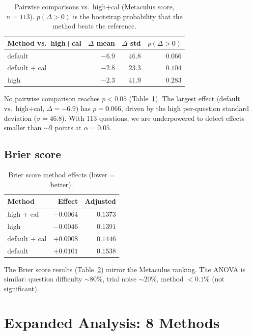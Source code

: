 \documentclass[11pt]{article}
\begin{document}
\begin{table}[h]
\centering
\begin{tabular}{lrrr}
\toprule
Method vs.\ high+cal & $\Delta$ mean & $\Delta$ std & $p(\Delta > 0)$ \\
\midrule
default           & $-6.9$ & $46.8$ & $0.066$ \\
default + cal     & $-2.8$ & $23.3$ & $0.104$ \\
high              & $-2.3$ & $41.9$ & $0.283$ \\
\bottomrule
\end{tabular}
\caption{Pairwise comparisons vs.\ high+cal (Metaculus score, $n=113$).
  $p(\Delta > 0)$ is the bootstrap probability that the method beats
  the reference.}
\label{tab:simple_pairwise}
\end{table}

No pairwise comparison reaches $p < 0.05$
(Table~\ref{tab:simple_pairwise}).  The largest effect
(default vs.\ high+cal, $\Delta = -6.9$) has $p = 0.066$, driven by the
high per-question standard deviation ($\sigma = 46.8$).  With 113 questions,
we are underpowered to detect effects smaller than $\sim 9$ points at
$\alpha = 0.05$.

\subsection{Brier score}

\begin{table}[h]
\centering
\begin{tabular}{lrr}
\toprule
Method & Effect & Adjusted \\
\midrule
high + cal & $-0.0064$ & $0.1373$ \\
high       & $-0.0046$ & $0.1391$ \\
default + cal & $+0.0008$ & $0.1446$ \\
default    & $+0.0101$ & $0.1538$ \\
\bottomrule
\end{tabular}
\caption{Brier score method effects (lower = better).}
\label{tab:brier_effects}
\end{table}

The Brier score results (Table~\ref{tab:brier_effects}) mirror the
Metaculus ranking.  The ANOVA is similar: question difficulty $\sim 80\%$,
trial noise $\sim 20\%$, method $< 0.1\%$ (not significant).


\section{Expanded Analysis: 8 Methods}
\label{sec:expanded}
\end{document}
